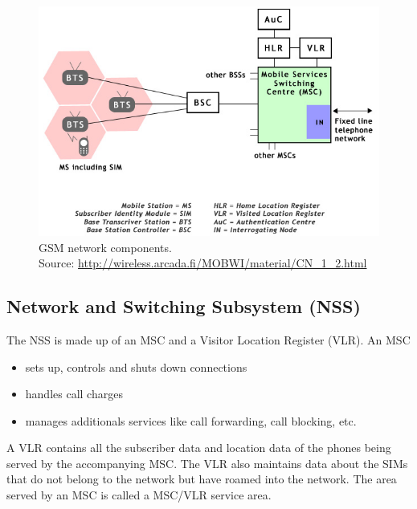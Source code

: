 \begin{figure}
\centering
\includegraphics[scale=0.5]{gsmNetworkComponents}
\caption[GSM network components]{GSM network components.\\
\footnotesize{Source: 
\url{http://wireless.arcada.fi/MOBWI/material/CN\_1\_2.html}}}
\end{figure}




\subsection{Network and Switching Subsystem (NSS)}

The NSS is made up of an MSC and a Visitor Location Register (VLR). An MSC 
\begin{itemize}[noitemsep,topsep=0pt,parsep=0pt,partopsep=0pt]
\item sets up, controls and shuts down connections
\item handles call charges
\item manages additionals services like call forwarding, call blocking, etc.
\end{itemize}

A VLR contains all the subscriber data and location data of the phones being 
served by the accompanying MSC. The VLR also maintains data about the SIMs 
that do not belong to the network but have roamed into the network. The area 
served by an MSC is called a MSC/VLR service area.


